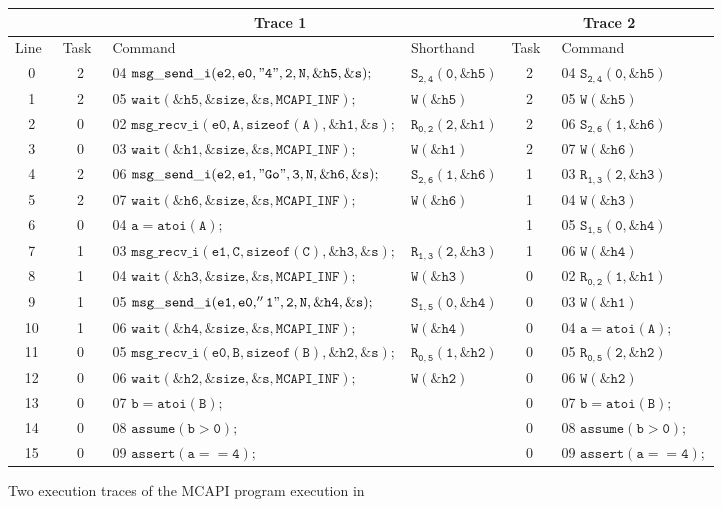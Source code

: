 \begin{figure*}
\begin{center}
\setlength{\tabcolsep}{2pt}
\scriptsize \begin{tabular}[t]{|c|c|l|l||c|l|}
\hline
& \multicolumn{3}{|c||}{Trace 1} & \multicolumn{2}{|c|}{Trace 2}\\
\hline
Line\ & Task\  & Command\ & Shorthand\ & Task\ & Command\  \\
\hline
0 & 2 & 04 $\mathtt{msg\_send\_i(e2,e0,"4",2,N,\&h5,\&s);}$ & $\mathtt{S_{2,4}(0,\&h5)}$ & 2 & 04 $\mathtt{S_{2,4}(0,\&h5)}$ \\
1 & 2 & 05 $\mathtt{wait(\&h5,\&size,\&s,MCAPI\_INF);}$ & $\mathtt{W(\&h5)}$ & 2 & 05 $\mathtt{W(\&h5)}$ \\
2 & 0 & 02 $\mathtt{msg\_recv\_i(e0,A,sizeof(A),\&h1,\&s);}$ & $\mathtt{R_{0,2}(2,\&h1)}$ & 2 & 06 $\mathtt{S_{2,6}(1,\&h6)}$ \\
3 & 0 & 03 $\mathtt{wait(\&h1,\&size,\&s,MCAPI\_INF);}$ & $\mathtt{W(\&h1)}$ & 2 & 07 $\mathtt{W(\&h6)}$ \\
4 & 2 & 06 $\mathtt{msg\_send\_i(e2,e1,"Go",3,N,\&h6,\&s);}$ & $\mathtt{S_{2,6}(1,\&h6)}$ & 1 & 03 $\mathtt{R_{1,3}(2,\&h3)}$ \\
5 & 2 & 07 $\mathtt{wait(\&h6,\&size,\&s,MCAPI\_INF);}$ & $\mathtt{W(\&h6)}$ & 1 & 04 $\mathtt{W(\&h3)}$ \\
6 & 0 & 04 $\mathtt{a = atoi(A);}$ & & 1 & 05 $\mathtt{S_{1,5}(0,\&h4)}$ \\
7 & 1 & 03 $\mathtt{msg\_recv\_i(e1,C,sizeof(C),\&h3,\&s);}$ & $\mathtt{R_{1,3}(2,\&h3)}$ & 1 & 06 $\mathtt{W(\&h4)}$ \\
8 & 1 & 04 $\mathtt{wait(\&h3,\&size,\&s,MCAPI\_INF);}$ & $\mathtt{W(\&h3)}$ & 0 & 02 $\mathtt{R_{0,2}(1,\&h1)}$ \\
9 & 1 & 05 $\mathtt{msg\_send\_i(e1,e0,''1",2,N,\&h4,\&s);}$ & $\mathtt{S_{1,5}(0,\&h4)}$ & 0 & 03 $\mathtt{W(\&h1)}$ \\
10 & 1 & 06 $\mathtt{wait(\&h4,\&size,\&s,MCAPI\_INF);}$ & $\mathtt{W(\&h4)}$ & 0 & 04 $\mathtt{a = atoi(A);}$ \\
11 & 0 & 05 $\mathtt{msg\_recv\_i(e0,B,sizeof(B),\&h2,\&s);}$ & $\mathtt{R_{0,5}(1,\&h2)}$ & 0 & 05 $\mathtt{R_{0,5}(2,\&h2)}$\\
12 & 0 & 06 $\mathtt{wait(\&h2,\&size,\&s,MCAPI\_INF);}$ & $\mathtt{W(\&h2)}$ & 0 & 06 $\mathtt{W(\&h2)}$ \\
13 & 0 & 07 $\mathtt{b = atoi(B);}$ & & 0 & 07 $\mathtt{b = atoi(B);}$ \\
14 & 0 & 08 $\mathtt{assume (b > 0);}$ & & 0 & 08 $\mathtt{assume (b > 0);}$ \\
15 & 0 & 09 $\mathtt{assert(a == 4);}$ & & 0 & 09 $\mathtt{assert(a == 4);}$ \\
\hline
\end{tabular}
\end{center}
\caption{Two execution traces of the MCAPI program execution in }
\label{fig:trace}
\end{figure*}

